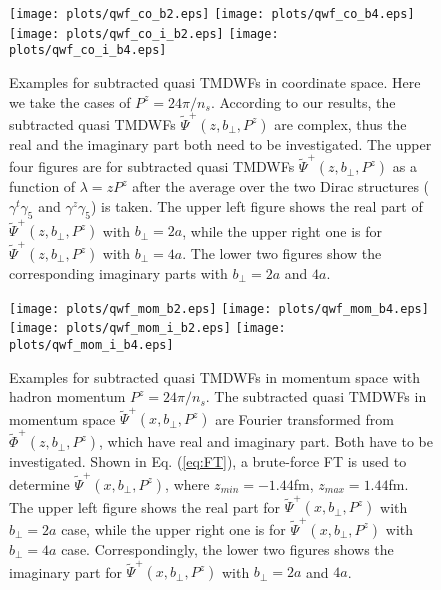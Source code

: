 \documentclass[prd,aps,twocolumn,preprintnumbers, showpacs, nofootinbib,superscriptaddress,notitlepage]{revtex4-1}
\newcommand\bl{\color{blue}}
\begin{document}
\begin{widetext}

\begin{figure}
\centering
\texttt{[image: plots/qwf\_co\_b2.eps]}
\texttt{[image: plots/qwf\_co\_b4.eps]}
\texttt{[image: plots/qwf\_co\_i\_b2.eps]}
\texttt{[image: plots/qwf\_co\_i\_b4.eps]}
\caption{Examples for subtracted quasi TMDWFs in coordinate space. Here we take the cases of $P^z=24\pi/n_s$. According to our results, the subtracted quasi TMDWFs $\tilde{\Psi}^+(z,b_{\perp},P^z)$ are complex, thus the {\bl real and the imaginary part both} need to be investigated. The upper four figures are for subtracted quasi TMDWFs $\tilde{\Psi}^+(z,b_{\perp},P^z)$ as a function of $\lambda=zP^z$ after the average {\bl over the two Dirac structures ($\gamma^t\gamma_5$ and $\gamma^z\gamma_5$) is taken}. The upper left figure shows the real part of $\tilde{\Psi}^+(z,b_{\perp},P^z)$ with $b_{\perp}=2a$, {\bl while} the upper right one is for $\tilde{\Psi}^+(z,b_{\perp},P^z)$ with $b_{\perp}=4a$. {\bl The lower two figures show the} corresponding imaginary parts with $b_{\perp}=2a$ and $4a$.}
    \label{fig:qwf_co}
\end{figure}


\begin{figure}
\centering
\texttt{[image: plots/qwf\_mom\_b2.eps]}
\texttt{[image: plots/qwf\_mom\_b4.eps]}
\texttt{[image: plots/qwf\_mom\_i\_b2.eps]}
\texttt{[image: plots/qwf\_mom\_i\_b4.eps]}
\caption{Examples for subtracted quasi TMDWFs in momentum space with {\bl hadron} momentum $P^z=24\pi/n_s$. The subtracted quasi TMDWFs in momentum space $\tilde{\Psi}^+(x,b_{\perp},P^z)$ are Fourier transformed from {\bl $\tilde{\Phi}^+(z,b_{\perp},P^z)$}, which have real and imaginary {\bl part. Both have to be investigated.} Shown in Eq. (\ref{eq:FT}), {\bl a brute-force} FT is used to determine $\tilde{\Psi}^+(x,b_{\perp},P^z)$, where $z_{min}=-1.44$fm, $z_{max}=1.44$fm. The upper left figure shows the real part for $\tilde{\Psi}^+(x,b_{\perp},P^z)$ with $b_{\perp}=2a$ case, while the upper right one is for $\tilde{\Psi}^+(x,b_{\perp},P^z)$ with $b_{\perp}=4a$ case. Correspondingly, the lower two figures shows the imaginary part for $\tilde{\Psi}^+(x,b_{\perp},P^z)$ with $b_{\perp}=2a$ and $4a$.}
    \label{fig:qwf_momenta}
\end{figure}


\end{widetext}
\end{document}
